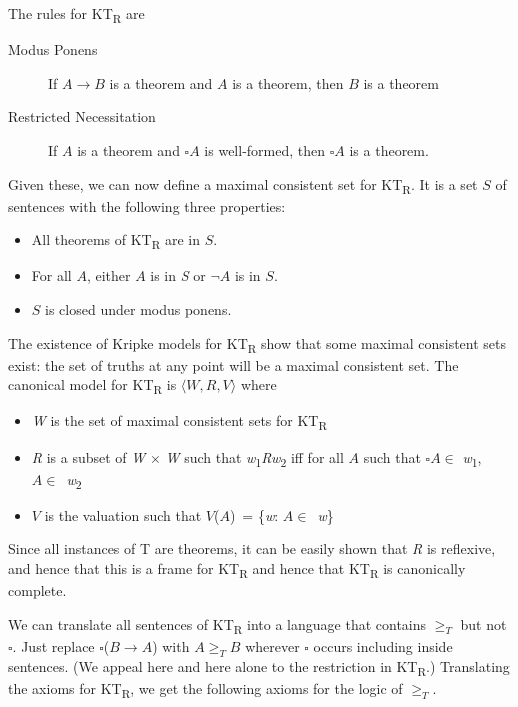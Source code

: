 \noindent The rules for KT\textsubscript{R} are

\begin{description}
\item[Modus Ponens] If \(A \rightarrow B\) is a theorem and \(A\) is a theorem, then \(B\) is a theorem
\item[Restricted Necessitation] If \(A\) is a theorem and \(\square A\) is well-formed, then \(\square A\) is a theorem.
\end{description}

\noindent Given these, we can now define a maximal consistent set for KT\textsubscript{R}. It is a set \(S\) of sentences with the following three properties:

\begin{itemize}
\item All theorems of KT\textsubscript{R} are in \(S\).
\item For all \(A\), either \(A\) is in \textit{S }or \(\neg A\) is in \(S\).
\item \(S\) is closed under modus ponens.
\end{itemize}

\noindent The existence of Kripke models for KT\textsubscript{R} show that some maximal consistent sets exist: the set of truths at any point will be a maximal consistent set. The canonical model for KT\textsubscript{R} is \(\langle W, R, V \rangle\) where

\begin{itemize}
\item \textit{W} is the set of maximal consistent sets for KT\textsubscript{R}
\item \textit{R} is a subset of \textit{W} \(\times\) \textit{W} such that \textit{w}\textsubscript{1}\textit{Rw}\textsubscript{2} iff for all \(A\) such that \(\square A \in\) \textit{w}\textsubscript{1}, \(A \in\)~\textit{w}\textsubscript{2}
\item \(V\) is the valuation such that \(V\)(\(A\))~= \{\textit{w}: \(A \in\)~\textit{w}\}
\end{itemize}

\noindent Since all instances of T are theorems, it can be easily shown that \textit{R} is reflexive, and hence that this is a frame for KT\textsubscript{R} and hence that KT\textsubscript{R} is canonically complete.

We can translate all sentences of KT\textsubscript{R} into a language that contains \(\geqslant _T\) but not \(\square\). Just replace \(\square\)(\(B \rightarrow A\)) with \(A \geqslant _T B\) wherever \(\square\) occurs including inside sentences. (We appeal here and here alone to the restriction in KT\textsubscript{R}.) Translating the axioms for KT\textsubscript{R}, we get the following axioms for the logic of \(\geqslant _T\).

